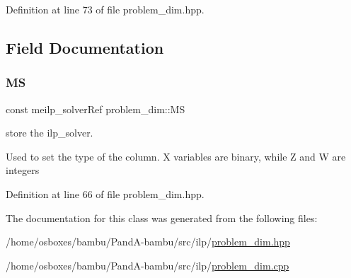 Definition at line 73 of file problem\+\_\+dim.\+hpp.



\subsection{Field Documentation}
\mbox{\label{classproblem__dim_a0a309c8db18b74b5040da52494e30044}} 
\subsubsection{\texorpdfstring{MS}{MS}}
{\footnotesize\ttfamily const meilp\+\_\+solver\+Ref problem\+\_\+dim\+::\+MS\hspace{0.3cm}{\ttfamily [protected]}}



store the ilp\+\_\+solver. 

Used to set the type of the column. X variables are binary, while Z and W are integers 

Definition at line 66 of file problem\+\_\+dim.\+hpp.



The documentation for this class was generated from the following files\+:\begin{DoxyCompactItemize}
\item 
/home/osboxes/bambu/\+Pand\+A-\/bambu/src/ilp/\hyperlink{problem__dim_8hpp}{problem\+\_\+dim.\+hpp}\item 
/home/osboxes/bambu/\+Pand\+A-\/bambu/src/ilp/\hyperlink{problem__dim_8cpp}{problem\+\_\+dim.\+cpp}\end{DoxyCompactItemize}
